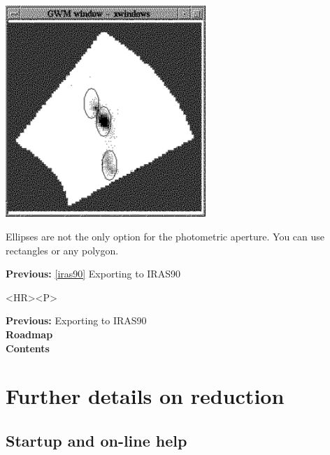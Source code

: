 \documentclass[11pt]{article}
\newcommand{\htmladdimg}[1]{}
\newenvironment{latexonly}{}{}
\newcommand{\htmlref}[2]{#1}
\newcommand{\xlabel}[1]{}
\begin{document}
\begin{latexonly}
\begin{center}
\leavevmode\includegraphics[height=80mm]{sc1_skyphot}
\end{center}
\end{latexonly}
\htmladdimg{addon/skyphot.gif}

   Ellipses are not the only option for the photometric aperture. You
   can use rectangles or any polygon.

\begin{latexonly}
{\bf Previous:} \ref{iras90} Exporting to IRAS90\\
\end{latexonly}

\begin{htmlonly}
\begin{rawhtml} <HR><P> \end{rawhtml}
{\bf \htmlref{Previous:}{iras90}} Exporting to IRAS90\\
{\bf \htmlref{Roadmap}{roadmap}}\\
{\bf \htmlref{Contents}{stardoccontents}}\\
\end{htmlonly}


\newpage
\section{Further details on reduction}

\subsection{\label{start2}\xlabel{start2}Startup and on-line help}
\end{document}
